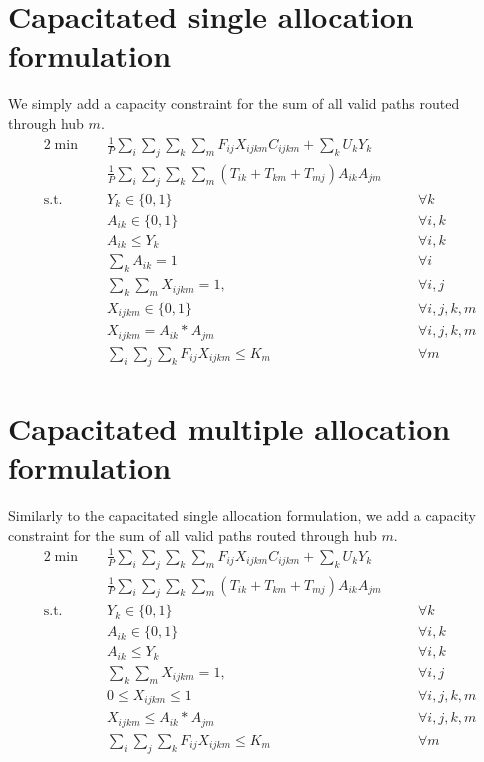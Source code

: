 \documentclass{llncs}
\begin{document}
\section{Capacitated single allocation formulation}	
	We simply add a capacity constraint for the sum of all valid paths routed through hub $m$. 
	\begin{alignat}{2}
		\min\quad
		& \frac{1}{P} \sum_{i}\sum_{j}\sum_{k}\sum_{m}F_{ij}  X_{ijkm} C_{ijkm} + \sum_{k}U_k Y_{k} & & \nonumber\\
		\quad& \frac{1}{P} \sum_{i}\sum_{j}\sum_{k}\sum_{m}{(T_{ik}+ T_{km}+ T_{mj} ) A_{ik} A_{jm}}  & & \tag{LP4}\label{lp4}\\
		\mbox{s.t.}  \quad
		&Y_{k} \in \{0,1\} &\quad& \forall k \label{st3.1}\\ 
		&A_{ik} \in \{0,1\} &\quad& \forall i,k \label{st3.2}\\ 
		&A_{ik} \leq Y_{k} &\quad& \forall i,k \label{st3.3}\\
		&\sum_{k}{A_{ik}} = 1 &\quad& \forall i \label{st3.4}\\
		&\sum_{k}\sum_{m}{X_{ijkm} = 1}, &\quad& \forall i,j \label{st3.5}\\
		&X_{ijkm} \in \{0,1\} &\quad& \forall i,j,k,m \label{st3.6}\\
		&X_{ijkm} = A_{ik} * A_{jm} &\quad& \forall i,j,k,m \label{st3.7} \\
		&\sum_{i}\sum_{j}\sum_{k}{F_{ij}X_{ijkm} \leq K_{m}} &\quad& \forall m \label{st3.8} 
	\end{alignat}

\section{Capacitated multiple allocation formulation}	
Similarly to the capacitated single allocation formulation, we add a capacity constraint for the sum of all valid paths routed through hub $m$.
	\begin{alignat}{2}
		\min\quad
		& \frac{1}{P} \sum_{i}\sum_{j}\sum_{k}\sum_{m}F_{ij}  X_{ijkm} C_{ijkm} + \sum_{k}U_k Y_{k} & & \nonumber\\
		\quad& \frac{1}{P} \sum_{i}\sum_{j}\sum_{k}\sum_{m}{(T_{ik}+ T_{km}+ T_{mj} ) A_{ik} A_{jm}}  & & \tag{LP5}\label{lp5}\\
		\mbox{s.t.}  \quad
		&Y_{k} \in \{0,1\} &\quad& \forall k \label{st4.1}\\ 
		&A_{ik} \in \{0,1\} &\quad& \forall i,k \label{st4.2}\\ 
		&A_{ik} \leq Y_{k} &\quad& \forall i,k \label{st4.3}\\
		&\sum_{k}\sum_{m}{X_{ijkm} = 1}, &\quad& \forall i,j \label{st4.4}\\
		& 0 \leq X_{ijkm} \leq 1 &\quad& \forall i,j,k,m \label{st4.5}\\
		&X_{ijkm} \leq A_{ik} * A_{jm} &\quad& \forall i,j,k,m \label{st4.6} \\
		&\sum_{i}\sum_{j}\sum_{k}{F_{ij}X_{ijkm} \leq K_{m}} &\quad& \forall m \label{st3.8}
	\end{alignat}
	
\end{document}
